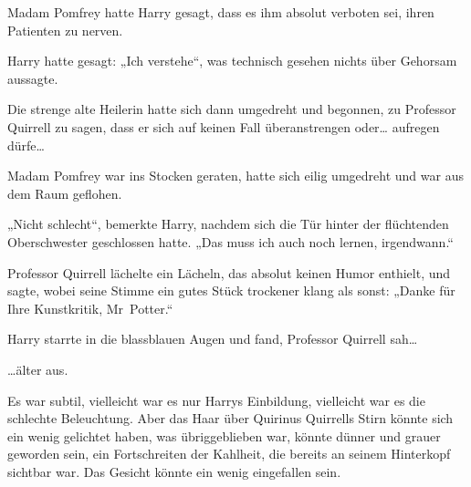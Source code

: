Madam Pomfrey hatte Harry gesagt, dass es ihm absolut verboten sei, ihren Patienten zu nerven.

Harry hatte gesagt: „Ich verstehe“, was technisch gesehen nichts über Gehorsam aussagte.

Die strenge alte Heilerin hatte sich dann umgedreht und begonnen, zu Professor Quirrell zu sagen, dass er sich auf keinen Fall überanstrengen oder… aufregen dürfe…

Madam Pomfrey war ins Stocken geraten, hatte sich eilig umgedreht und war aus dem Raum geflohen.

„Nicht schlecht“, bemerkte Harry, nachdem sich die Tür hinter der flüchtenden Oberschwester geschlossen hatte. „Das muss ich auch noch lernen, irgendwann.“

Professor Quirrell lächelte ein Lächeln, das absolut keinen Humor enthielt, und sagte, wobei seine Stimme ein gutes Stück trockener klang als sonst: „Danke für Ihre Kunstkritik, Mr~Potter.“

Harry starrte in die blassblauen Augen und fand, Professor Quirrell sah…

…älter aus.

Es war subtil, vielleicht war es nur Harrys Einbildung, vielleicht war es die schlechte Beleuchtung. Aber das Haar über Quirinus Quirrells Stirn könnte sich ein wenig gelichtet haben, was übriggeblieben war, könnte dünner und grauer geworden sein, ein Fortschreiten der Kahlheit, die bereits an seinem Hinterkopf sichtbar war. Das Gesicht könnte ein wenig eingefallen sein.

